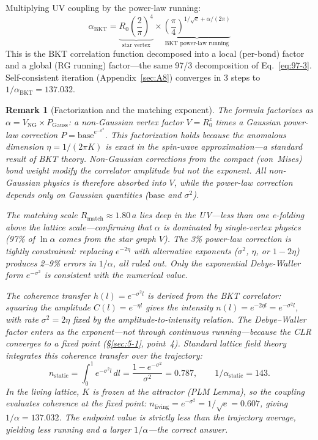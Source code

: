 \documentclass[aps,prd,onecolumn,superscriptaddress,floatfix,12pt]{revtex4-2}
\newcommand{\Rzero}{R_0}
\newcommand{\alphaBKT}{\alpha_{\text{BKT}}}
\newtheorem{remark}{Remark}[section]
\begin{document}
Multiplying UV coupling by the power-law running:
\begin{equation}\label{eq:alpha-bkt}
\boxed{\alphaBKT = \underbrace{\Rzero\!\left(\frac{2}{\pi}\right)^{\!4}}_{\text{star vertex}} \times \underbrace{\left(\frac{\pi}{4}\right)^{\!1/\sqrt{e} + \alpha/(2\pi)}}_{\text{BKT power-law running}}}
\end{equation}
This is the BKT correlation function decomposed into a local (per-bond) factor and a global (RG running) factor---the same 97/3 decomposition of Eq.~\eqref{eq:97-3}. Self-consistent iteration (Appendix~\ref{sec:A8}) converges in 3 steps to $1/\alphaBKT = 137.032$.

\begin{remark}[Factorization and the matching exponent]\label{rem:matching-exponent}
The formula factorizes as $\alpha = V_{\text{NG}} \times P_{\text{Gauss}}$: a non-Gaussian vertex factor $V = \Rzero^z$ times a Gaussian power-law correction $P = \text{base}^{e^{-\sigma^2}}$.  This factorization holds because the anomalous dimension $\eta = 1/(2\pi K)$ is \emph{exact} in the spin-wave approximation---a standard result of BKT theory.  Non-Gaussian corrections from the compact (von~Mises) bond weight modify the correlator \emph{amplitude} but not the \emph{exponent}.  All non-Gaussian physics is therefore absorbed into $V$, while the power-law correction depends only on Gaussian quantities ($\text{base}$ and $\sigma^2$).

The matching scale $R_{\text{match}} \approx 1.80\,a$ lies deep in the UV---less than one e-folding above the lattice scale---confirming that $\alpha$ is dominated by single-vertex physics (97\% of $\ln\alpha$ comes from the star graph $V$).  The 3\% power-law correction is tightly constrained: replacing $e^{-2\eta}$ with alternative exponents ($\sigma^2$, $\eta$, or $1 - 2\eta$) produces 2--9\% errors in $1/\alpha$, all ruled out.  Only the exponential Debye-Waller form $e^{-\sigma^2}$ is consistent with the numerical value.

The coherence transfer $h(l) = e^{-\sigma^2 l}$ is derived from the BKT correlator: squaring the amplitude $C(l) = e^{-\eta l}$ gives the intensity $n(l) = e^{-2\eta l} = e^{-\sigma^2 l}$, with rate $\sigma^2 = 2\eta$ fixed by the amplitude-to-intensity relation.  The Debye--Waller factor enters as the exponent---not through continuous running---because the CLR converges to a fixed point (\S\ref{sec:5-1}, point~4).  Standard lattice field theory integrates this coherence transfer over the trajectory:
\[
n_{\text{static}} = \int_0^1 e^{-\sigma^2 l}\,dl = \frac{1-e^{-\sigma^2}}{\sigma^2} = 0.787, \qquad 1/\alpha_{\text{static}} = 143.
\]
In the living lattice, $K$ is frozen at the attractor (PLM Lemma), so the coupling evaluates coherence \emph{at the fixed point}: $n_{\text{living}} = e^{-\sigma^2} = 1/\sqrt{e} = 0.607$, giving $1/\alpha = 137.032$.  The endpoint value is strictly less than the trajectory average, yielding less running and a larger $1/\alpha$---the correct answer.
\end{remark}
\end{document}

